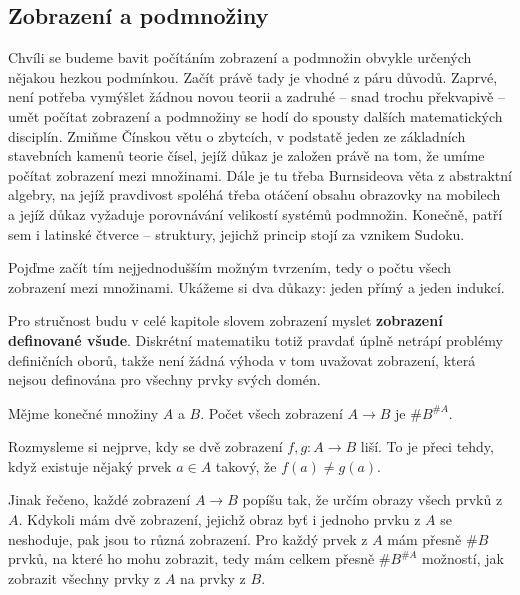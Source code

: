 \subsection{Zobrazení a podmnožiny}
\label{ssec:zobrazeni-a-podmnoziny}

Chvíli se budeme bavit počítáním zobrazení a podmnožin obvykle určených nějakou
hezkou podmínkou. Začít právě tady je vhodné z páru důvodů. Zaprvé, není potřeba
vymýšlet žádnou novou teorii a zadruhé -- snad trochu překvapivě -- umět počítat
zobrazení a podmnožiny se hodí do spousty dalších matematických disciplín.
Zmiňme Čínskou větu o zbytcích, v podstatě jeden ze základních stavebních kamenů
teorie čísel, jejíž důkaz je založen právě na tom, že umíme počítat zobrazení
mezi množinami. Dále je tu třeba Burnsideova věta z abstraktní algebry, na jejíž
pravdivost spoléhá třeba otáčení obsahu obrazovky na mobilech a jejíž důkaz
vyžaduje porovnávání velikostí systémů podmnožin. Konečně, patří sem i latinské
čtverce -- struktury, jejichž princip stojí za vznikem Sudoku.

Pojďme začít tím nejjednodušším možným tvrzením, tedy o počtu všech zobrazení
mezi množinami. Ukážeme si dva důkazy: jeden přímý a jeden indukcí.

\begin{warning}
 Pro stručnost budu v celé kapitole slovem zobrazení myslet \textbf{zobrazení
 definované všude}. Diskrétní matematiku totiž pravdať úplně netrápí problémy
 definičních oborů, takže není žádná výhoda v tom uvažovat zobrazení, která
 nejsou definována pro všechny prvky svých domén.
\end{warning}

\begin{claim}
 \label{claim:pocet-zobrazeni}
 Mějme konečné množiny $A$ a $B$. Počet všech zobrazení $A \to B$ je $\# B^{\#
 A}$.
\end{claim}

\begin{enhproof}
 Rozmysleme si nejprve, kdy se dvě zobrazení $f,g:A \to B$ liší. To je přeci
 tehdy, když existuje nějaký prvek $a \in A$ takový, že $f(a) \neq g(a)$.

 Jinak řečeno, každé zobrazení $A \to B$ popíšu tak, že určím obrazy všech prvků
 z $A$. Kdykoli mám dvě zobrazení, jejichž obraz byť i jednoho prvku z $A$ se
 neshoduje, pak jsou to různá zobrazení. Pro každý prvek z $A$ mám přesně $\# B$
 prvků, na které ho mohu zobrazit, tedy mám celkem přesně $\# B^{\# A}$ možností,
 jak zobrazit všechny prvky z $A$ na prvky z $B$.
\end{enhproof}

